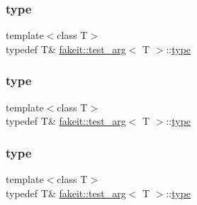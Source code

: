 \subsubsection{\texorpdfstring{type}{type}\hspace{0.1cm}{\footnotesize\ttfamily [4/9]}}
{\footnotesize\ttfamily template$<$class T$>$ \\
typedef T\& \mbox{\hyperlink{structfakeit_1_1test__arg}{fakeit\+::test\+\_\+arg}}$<$ T $>$\+::\mbox{\hyperlink{structfakeit_1_1test__arg_a100a8f745c77f37aad942184679a0399}{type}}}

\mbox{\label{structfakeit_1_1test__arg_a100a8f745c77f37aad942184679a0399}} 
\subsubsection{\texorpdfstring{type}{type}\hspace{0.1cm}{\footnotesize\ttfamily [5/9]}}
{\footnotesize\ttfamily template$<$class T$>$ \\
typedef T\& \mbox{\hyperlink{structfakeit_1_1test__arg}{fakeit\+::test\+\_\+arg}}$<$ T $>$\+::\mbox{\hyperlink{structfakeit_1_1test__arg_a100a8f745c77f37aad942184679a0399}{type}}}

\mbox{\label{structfakeit_1_1test__arg_a100a8f745c77f37aad942184679a0399}} 
\subsubsection{\texorpdfstring{type}{type}\hspace{0.1cm}{\footnotesize\ttfamily [6/9]}}
{\footnotesize\ttfamily template$<$class T$>$ \\
typedef T\& \mbox{\hyperlink{structfakeit_1_1test__arg}{fakeit\+::test\+\_\+arg}}$<$ T $>$\+::\mbox{\hyperlink{structfakeit_1_1test__arg_a100a8f745c77f37aad942184679a0399}{type}}}

\mbox{\label{structfakeit_1_1test__arg_a100a8f745c77f37aad942184679a0399}} 
